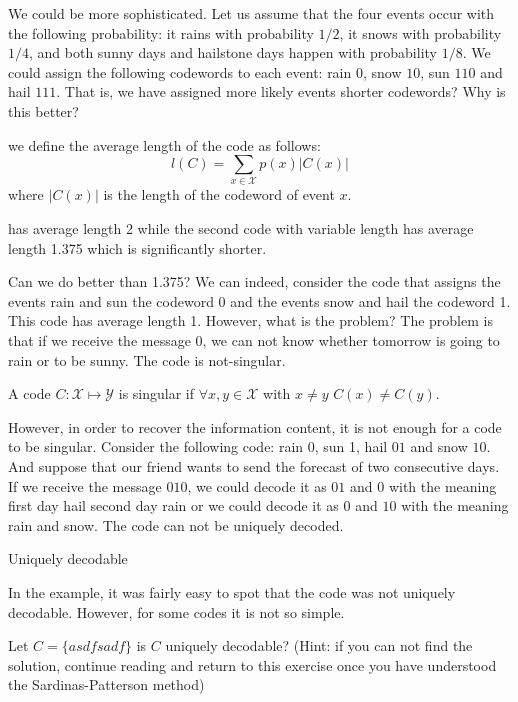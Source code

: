 We could be more sophisticated. Let us assume that the four events occur with the following probability: it rains with probability $1/2$, it snows with probability $1/4$, and both sunny days and hailstone days happen with probability $1/8$. We could assign the following codewords to each event: rain $0$, snow $10$, sun $110$ and hail $111$. That is, we have assigned more likely events shorter codewords? Why is this better?

\begin{definition}
we define the average length of the code as follows:
\begin{equation}
l(C)=\sum_{x\in\mathcal X}p(x)|C(x)|
\end{equation}
where $|C(x)|$ is the length of the codeword of event $x$.
\end{definition}
\begin{example}
has average length 2 while the second code with variable length has average length 1.375 which is significantly shorter. 
\end{example}

Can we do better than 1.375? We can indeed, consider the code that assigns the events rain and sun the codeword 0 and the events snow and hail the codeword 1. 
This code has average length 1. 
However, what is the problem? 
The problem is that if we receive the message 0, we can not know whether tomorrow is going to rain or to be sunny. 
The code is not-singular.

\begin{definition}
A code $C:\mathcal X\mapsto\mathcal Y$ is singular if $\forall x,y\in\mathcal X$ with $x\neq y$ $C(x)\neq C(y)$.
\end{definition}

However, in order to recover the information content, it is not enough for a code to be singular. Consider the following code: rain 0, sun 1, hail $01$ and snow $10$. 
And suppose that our friend wants to send the forecast of two consecutive days. 
If we receive the message $010$, we could decode it as $01$ and $0$ with the meaning first day hail second day rain or we could decode it as $0$ and $10$ with the meaning rain and snow.
The code can not be uniquely decoded.

\begin{definition}
Uniquely decodable
\end{definition}

In the example, it was fairly easy to spot that the code was not uniquely decodable. However, for some codes it is not so simple.
\begin{exercise}
Let $C=\{asdfsadf\}$ is $C$ uniquely decodable? (Hint: if you can not find the solution, continue reading and return to this exercise once you have understood the Sardinas-Patterson method)
\end{exercise}

